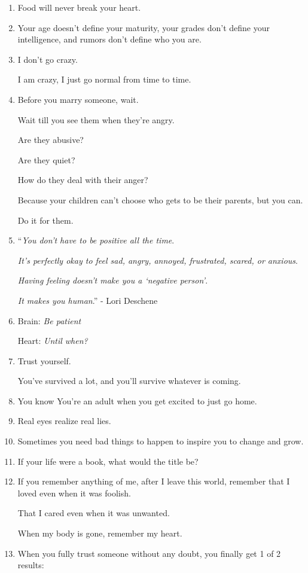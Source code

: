 \documentclass{article}
\numberwithin{equation}{section}
\begin{document}
\begin{enumerate}
    Your job is to pump blood, that's it.
    \item Food will never break your heart.
    \item Your age doesn't define your maturity, your grades don't define your intelligence, and rumors don't define who you are.
    \item I don't go crazy.
    
    I am crazy, I just go normal from time to time.
    \item Before you marry someone, wait.
    
    Wait till you see them when they're angry.
    
    Are they abusive?
    
    Are they quiet?
    
    How do they deal with their anger?
    
    Because your children can't choose who gets to be their parents, but you can.
    
    Do it for them.
    \item ``\textit{You don't have to be positive all the time}.
    
    \textit{It's perfectly okay to feel sad, angry, annoyed, frustrated, scared, or anxious}.
    
    \textit{Having feeling doesn't make you a `negative person'}.
    
    \textit{It makes you human}.'' - Lori Deschene
    \item Brain: \textit{Be patient}
    
    Heart: \textit{Until when?}
    \item Trust yourself.
    
    You've survived a lot, and you'll survive whatever is coming.
    \item You know You're an adult when you get excited to just go home.
    \item Real eyes realize real lies.
    \item Sometimes you need bad things to happen to inspire you to change and grow.
    \item If your life were a book, what would the title be?
    \item If you remember anything of me, after I leave this world, remember that I loved even when it was foolish.
    
    That I cared even when it was unwanted.
    
    When my body is gone, remember my heart.
    \item When you fully trust someone without any doubt, you finally get 1 of 2 results:
    

\end{enumerate}
\end{document}
